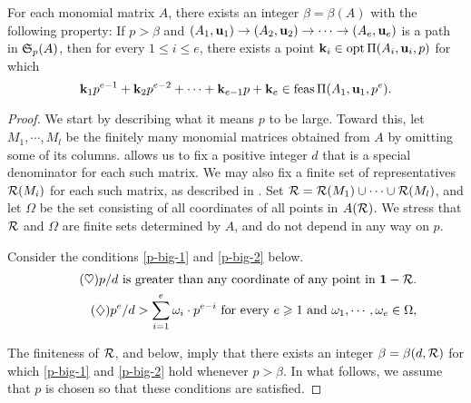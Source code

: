 \documentclass[11pt]{amsart}
\newcommand{\denom}{d} %
\begin{document}
\begin{theorem}
\label{ILL: T}
   For each monomial matrix $A$, there exists an integer $\beta = \beta(A)$ with the following property\textup:
   If $p>\beta$ and $(A_1, \mathbf{u}_1) \to (A_2, \mathbf{u}_2) \to \cdots \to (A_e, \mathbf{u}_e)$ is a path in $\mathfrak{S}_p(A)$, then for every $1 \leq i \leq e$, there exists a point $\mathbf{k}_i \in \operatorname{opt} \Pi(A_i, \mathbf{u}_i,p)$  for which
 \[
  \mathbf{k}_1 p^{e-1} + \mathbf{k}_2 p^{e-2} + \cdots + \mathbf{k}_{e-1} p + \mathbf{k}_e \in \operatorname{feas} \Pi(A_1, \mathbf{u}_1, p^e).
 \] 
\end{theorem}

\begin{proof}  We start by describing what it means $p$ to be large.  Toward this, let $M_1, \cdots, M_l$ be the finitely many monomial matrices obtained from $A$ by omitting some of its columns.   allows us to fix a positive integer $\denom$ that is a special denominator for each such matrix.  We may also fix a finite set of representatives $\mathcal{R}(M_i)$ for each such matrix, as described in .  Set $\mathcal{R} = \mathcal{R}(M_1) \cup \cdots \cup \mathcal{R}(M_l)$, and let $\Omega$ be the set consisting of all coordinates of all points in $A(\mathcal{R})$.  We stress that $\mathcal{R}$ and $\Omega$ are finite sets determined by $A$, and do not depend in any way on $p$.

Consider the conditions \eqref{p-big-1} and \eqref{p-big-2} below.
%
\begin{align}
\tag{$\heartsuit$} \label{p-big-1}
\text{$p/\denom$ is greater than any coordinate of any point in $\vv{1} - \fsr$.} \\
 \label{p-big-2}
\tag{$\diamondsuit$}\text{$p^e / \denom > \sum_{i=1}^e \omega_i \cdot p^{e-i}$ for every $e \geq 1$ and $\omega_1, \cdots, \omega_e \in \Omega$,}
\end{align}

The finiteness of $\mathcal{R}$,  and  below, imply that there exists an integer $\beta = \beta(\denom, \fsr)$ for which \eqref{p-big-1} and \eqref{p-big-2} hold whenever $p > \beta$.  In what follows, we assume that $p$ is chosen so that these conditions are satisfied.


\end{proof}
\end{document}
